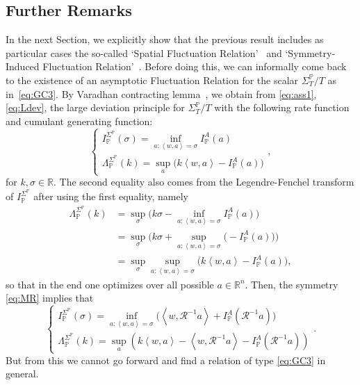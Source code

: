\documentclass[a4paper,11pt]{article}
\numberwithin{equation}{section}
\begin{document}
\subsection{Further Remarks}
\label{subsec:remarks}

In the next Section, we explicitly show that the previous result includes as particular cases the so-called `Spatial Fluctuation Relation'~\cite{PRG15} and `Symmetry-Induced Fluctuation Relation'~\cite{MPG20}.  
Before doing this, we can informally come back to the existence of an
asymptotic Fluctuation Relation for the scalar $\varSigma_{T}^{\mathbb{P}}/T$
as in~\eqref{eq:GC3}. By Varadhan contracting lemma~\cite{Var66,Tou09}, we obtain from \eqref{eq:ass1},\eqref{eq:Ldev},
the large deviation principle for $\varSigma_{T}^{\mathbb{P}}/T$ with the following rate function and cumulant generating function: 
\begin{equation}
\label{eq:marre}
  \begin{cases}
I_{\mathbb{P}}^{\Sigma^{\mathbb{P}}}\left(\sigma\right)=\underset{a : \left\langle w, a \right\rangle =\sigma}{\inf} I_{\mathbb{P}}^{A}\left(a\right)\\
\Lambda_{\mathbb{P}}^{\Sigma^{\mathbb{P}}}\left(k \right)= \underset{a}{\sup} \big( k\left\langle w,a\right\rangle -I_{\mathbb{P}}^A\left(a\right)\big)
\end{cases},  
\end{equation}
for $k,\sigma \in \mathbb{R}$.
The second equality also comes from the Legendre-Fenchel transform of $I_{\mathbb{P}}^{\Sigma^{\mathbb{P}}}$ after using the first equality, namely
\begin{align*}
 \Lambda_{\mathbb{P}}^{\Sigma^{\mathbb{P}}}\left(k \right) &=  \underset{\sigma}{\sup} \Big( k\sigma - \underset{a : \left\langle w, a \right\rangle =\sigma}{\inf} I_{\mathbb{P}}^A\left(a\right)\Big)  \\
 &= \underset{\sigma}{\sup} \Big( k\sigma + \underset{a : \left\langle w, a \right\rangle =\sigma}{\sup} \big(- I_{\mathbb{P}}^A\left(a\right)\big)\Big) \\
 &= \underset{\sigma}{\sup} \underset{a : \left\langle w, a \right\rangle =\sigma}{\sup} \Big( k\left\langle w, a \right\rangle - I_{\mathbb{P}}^A\left(a\right)\Big) ,
\end{align*}
so that in the end one optimizes over all possible $a \in \mathbb{R}^n$.
Then, the symmetry \eqref{eq:MR} implies that 
\begin{equation}\label{eq:symmetryScalar}
    \begin{cases}
I_{\mathbb{P}}^{\Sigma^{\mathbb{P}}}\left(\sigma\right)=\underset{a : \left\langle w, a \right\rangle =\sigma}{\inf} \big(\left\langle w,\mathcal{R}^{-1} a\right\rangle +I_{\mathbb{P}}^A\left(\mathcal{R}^{-1} a\right)\big)\\
\Lambda_{\mathbb{P}}^{\Sigma^{\mathbb{P}}}\left(k \right)=\underset{a}{\sup} \left( k \left\langle w, a \right\rangle -\left\langle w,\mathcal{R}^{-1} a \right\rangle -I_{\mathbb{P}}^A\left(\mathcal{R}^{-1} a \right)\right)
\end{cases}.
\end{equation}
But from this we cannot go forward and find a relation of type \eqref{eq:GC3} in general.
\end{document}
